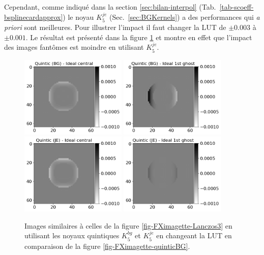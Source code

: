 \documentclass[11pt,twoside]{article}
\begin{document}
Cependant, comme indiqué dans la section \ref{sec:bilan-interpol} (Tab.~\ref{tab-scoeff-bsplinecardapprox}) le noyau $K_5^{je}$ (Sec.~\ref{sec:BGKernels}) a des performances qui \textit{a priori} sont meilleures. Pour illustrer l'impact il faut changer la LUT de $\pm 0.003$ à $\pm 0.001$. Le résultat est présenté dans la figure
\ref{fig-FXimagette-quinticJE} et montre en effet que l'impact des images fantômes est moindre en utilisant   $K_5^{je}$. 
\begin{figure}
\centering
\includegraphics[width=0.45\textwidth]{fig23c.png}
\includegraphics[width=0.45\textwidth]{fig23d.png}\\
\includegraphics[width=0.45\textwidth]{fig24a.png}
\includegraphics[width=0.45\textwidth]{fig24b.png}
\caption{Images similaires à celles de la figure \ref{fig-FXimagette-Lanczos3} en utilisant les noyaux quintiques $K_5^{bg}$ et $K_5^{je}$ en changeant la LUT en comparaison de la figure \ref{fig-FXimagette-quinticBG}.}
\label{fig-FXimagette-quinticJE}
\end{figure}
\end{document}

